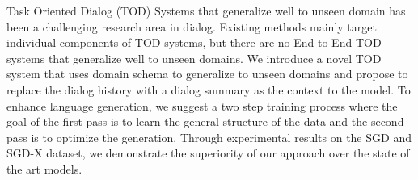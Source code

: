 Task Oriented Dialog (TOD) Systems that generalize well to unseen domain has been a challenging research area in dialog.
Existing methods mainly target individual components of TOD systems, but there are no End-to-End TOD systems that generalize well to unseen domains.
We introduce a novel TOD system that uses domain schema to generalize to unseen domains and propose to replace the dialog history with a
dialog summary as the context to the model. To enhance language generation, we suggest a two step training process where the goal of the first
pass is to learn the general structure of the data and the second pass is to optimize the generation.
Through experimental results on the SGD and SGD-X dataset, we demonstrate the superiority of our approach over the state of the art models.